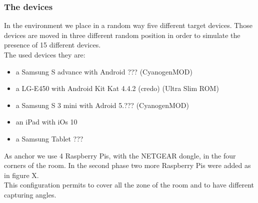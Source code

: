 \subsubsection{The devices}
In the environment we place in a random way five different target devices. Those devices are moved in three different random position in order to simulate the presence of 15 different devices.\\
The used devices they are:
\begin{itemize}
\item a Samsung S advance with Android ??? (CyanogenMOD)
\item a LG-E450 with Android Kit Kat 4.4.2 (credo) (Ultra Slim ROM)
\item a Samsung S 3 mini with Adroid 5.??? (CyanogenMOD)
\item an iPad with iOs 10
\item a Samsung Tablet ???
\end{itemize}
As anchor we use 4 Raspberry Pis, with the NETGEAR dongle, in the four corners of the room. In the second phase two more Raspberry Pis were added as in figure X. \\
This configuration permits to cover all the zone of the room and to have different capturing angles.

